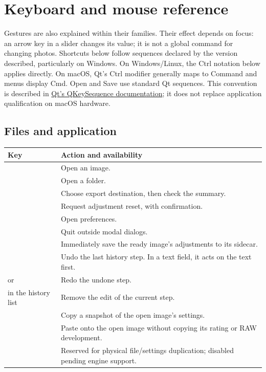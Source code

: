 \chapter{Keyboard and mouse reference}
\label{chap:raccourcis}
Gestures are also explained within their families. Their effect depends on
focus: an arrow key in a slider changes its value; it is not a global command
for changing photos. Shortcuts below follow sequences declared by the version
described, particularly on Windows.
On Windows/Linux, the Ctrl notation below applies directly. On macOS,
Qt's Ctrl modifier generally maps to Command and menus display Cmd.
Open and Save use standard Qt sequences. This convention is described in
\href{https://doc.qt.io/qt-6/qkeysequence.html}{Qt's QKeySequence documentation};
it does not replace application qualification on macOS hardware.

\clearpage
\section*{Files and application}
\begin{longtable}{@{}L{4.4cm}L{9.2cm}@{}}
\toprule Key & Action and availability\\\midrule\endhead
{} & Open an image.\\
 & Open a folder.\\
 & Choose export destination, then check the summary.\\
 & Request adjustment reset, with confirmation.\\
 & Open preferences.\\
 & Quit outside modal dialogs.\\
 & Immediately save the ready image's adjustments to its sidecar.\\
 & Undo the last history step. In a text field, it acts on the text first.\\
 or  & Redo the undone step.\\
 in the history list & Remove the edit of the current step.\\
 & Copy a snapshot of the open image's settings.\\
 & Paste onto the open image without copying its rating or RAW development.\\
 & Reserved for physical file/settings duplication; disabled pending engine support.\\
\bottomrule
\end{longtable}

